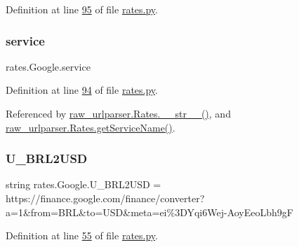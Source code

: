Definition at line \hyperlink{rates_8py_source_l00095}{95} of file \hyperlink{rates_8py_source}{rates.\+py}.

\mbox{\label{classrates_1_1_google_a1da08e36d5007aa5293d048b625a35e9}} 
\subsubsection{\texorpdfstring{service}{service}}
{\footnotesize\ttfamily rates.\+Google.\+service}



Definition at line \hyperlink{rates_8py_source_l00094}{94} of file \hyperlink{rates_8py_source}{rates.\+py}.



Referenced by \hyperlink{raw__urlparser_8py_source_l00038}{raw\+\_\+urlparser.\+Rates.\+\_\+\+\_\+str\+\_\+\+\_\+()}, and \hyperlink{raw__urlparser_8py_source_l00035}{raw\+\_\+urlparser.\+Rates.\+get\+Service\+Name()}.

\mbox{\label{classrates_1_1_google_a46dbc3fa0a110bf5b66808c29642cfa1}} 
\subsubsection{\texorpdfstring{U\+\_\+\+B\+R\+L2\+U\+SD}{U\_BRL2USD}}
{\footnotesize\ttfamily string rates.\+Google.\+U\+\_\+\+B\+R\+L2\+U\+SD = \textquotesingle{}https\+://finance.\+google.\+com/finance/converter?a=1\&from=B\+RL\&to=U\+SD\&meta=ei\%3\+D\+Yqi6\+Wej-\/\+Aoy\+Eeo\+Lbh9g\+F\textquotesingle{}\hspace{0.3cm}{\ttfamily [static]}}



Definition at line \hyperlink{rates_8py_source_l00055}{55} of file \hyperlink{rates_8py_source}{rates.\+py}.

\mbox{\label{classrates_1_1_google_a77ef7f5932c48b002697fb187a234d4a}} 
